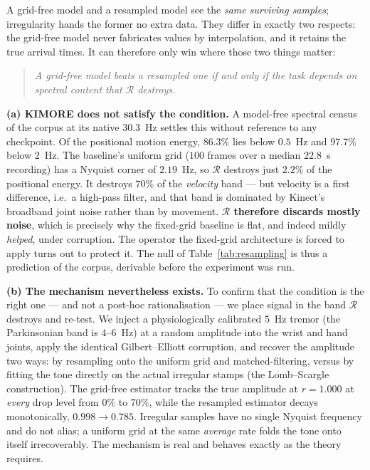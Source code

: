 A grid-free model and a resampled model see the \emph{same surviving samples}; irregularity hands
the former no extra data. They differ in exactly two respects: the grid-free model never fabricates
values by interpolation, and it retains the true arrival times. It can therefore only win where
those two things matter:
%
\begin{quote}
\emph{A grid-free model beats a resampled one if and only if the task depends on spectral content
that $\mathcal{R}$ destroys.}
\end{quote}

\textbf{(a) KIMORE does not satisfy the condition.} A model-free spectral census of the corpus at
its native $30.3$~Hz settles this without reference to any checkpoint. Of the positional motion
energy, $86.3\%$ lies below $0.5$~Hz and $97.7\%$ below $2$~Hz. The baseline's uniform grid ($100$
frames over a median $22.8$~s recording) has a Nyquist corner of $2.19$~Hz, so $\mathcal{R}$ destroys
just $\mathbf{2.2\%}$ of the positional energy. It destroys $70\%$ of the \emph{velocity} band --- but
velocity is a first difference, i.e.\ a high-pass filter, and that band is dominated by Kinect's
broadband joint noise rather than by movement. \textbf{$\mathcal{R}$ therefore discards mostly noise},
which is precisely why the fixed-grid baseline is flat, and indeed mildly \emph{helped}, under
corruption. The operator the fixed-grid architecture is forced to apply turns out to protect it. The
null of Table~\ref{tab:resampling} is thus a prediction of the corpus, derivable before the
experiment was run.

\textbf{(b) The mechanism nevertheless exists.} To confirm that the condition is the right one --- and
not a post-hoc rationalisation --- we place signal in the band $\mathcal{R}$ destroys and re-test. We
inject a physiologically calibrated $5$~Hz tremor (the Parkinsonian band is $4$--$6$~Hz) at a random
amplitude into the wrist and hand joints, apply the identical Gilbert--Elliott corruption, and
recover the amplitude two ways: by resampling onto the uniform grid and matched-filtering, versus by
fitting the tone directly on the actual irregular stamps (the Lomb--Scargle construction). The
grid-free estimator tracks the true amplitude at $r=\mathbf{1.000}$ at \emph{every} drop level from
$0\%$ to $70\%$, while the resampled estimator decays monotonically, $0.998\!\to\!0.785$. Irregular
samples have no single Nyquist frequency and do not alias; a uniform grid at the same \emph{average}
rate folds the tone onto itself irrecoverably. The mechanism is real and behaves exactly as the theory
requires.

